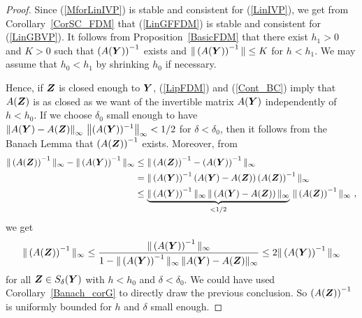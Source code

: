 
\begin{proof}
Since (\ref{MforLinIVP}) is stable and consistent for (\ref{LinIVP}),
we get from Corollary~\ref{CorSC_FDM} that
(\ref{LinGFFDM}) is stable and consistent for (\ref{LinGBVP}).
It follows from
Proposition~\ref{BasicFDM} that there exist $h_1 >0$ and $K>0$ such
that $\displaystyle \left(A(\bm{Y})\right)^{-1}$ exists and
$\displaystyle \| \left(A(\bm{Y})\right)^{-1} \| \leq K$ for
$h < h_1$.  We may assume that $h_0 < h_1$ by shrinking $h_0$ if
necessary.

Hence, if $\bm{Z}$ is closed enough to $\bm{Y}$, (\ref{LipFDM}) and
(\ref{Cont_BC}) imply that 
$A(\bm{Z})$ is as closed as we want of the invertible matrix
$A(\bm{Y})$ independently of $h < h_0$.  If we choose $\delta_0$
small enough to have
$\displaystyle \left\|A(\bm{Y}) - A(\bm{Z})\right\|_\infty
\, \left\| (A(\bm{Y}))^{-1}\right\|_\infty < 1/2$ for $\delta < \delta_0$,
then it follows from the Banach Lemma
that $\displaystyle \left(A(\bm{Z})\right)^{-1}$ exists.  Moreover, from
\begin{align*}
\| \left(A(\bm{Z})\right)^{-1}\|_\infty
- \|\left(A(\bm{Y})\right)^{-1}\|_\infty
& \leq \| \left(A(\bm{Z})\right)^{-1} - \left(A(\bm{Y})\right)^{-1}\|_\infty
\\
&= \| \left(A(\bm{Y})\right)^{-1}
\left( A(\bm{Y}) - A(\bm{Z}) \right)
\left(A(\bm{Z})\right)^{-1}\|_\infty \\
& \leq \underbrace{\| \left(A(\bm{Y})\right)^{-1} \|_\infty \,
\|\left( A(\bm{Y}) - A(\bm{Z}) \right)\|_\infty}_{<1/2} \,
\|\left(A(\bm{Z})\right)^{-1}\|_\infty \ ,
\end{align*}
we get
\[
\| \left(A(\bm{Z})\right)^{-1} \|_\infty \leq
\frac{\|\left(A(\bm{Y})\right)^{-1}\|_\infty}
{1-\|\left(A(\bm{Y})\right)^{-1}\|_\infty\,
\|A(\bm{Y})- A(\bm{Z})\|_\infty}
\leq 2 \|\left(A(\bm{Y})\right)^{-1}\|_\infty
\]
for all $\bm{Z} \in S_\delta(\bm{Y})$ with $h < h_0$ and
$\delta < \delta_0$.  We could have used Corollary~\ref{Banach_corG}
to directly draw the previous conclusion.  So
$\displaystyle \left(A(\bm{Z})\right)^{-1}$
is uniformly bounded for $h$ and $\delta$ small enough.


\end{proof}
